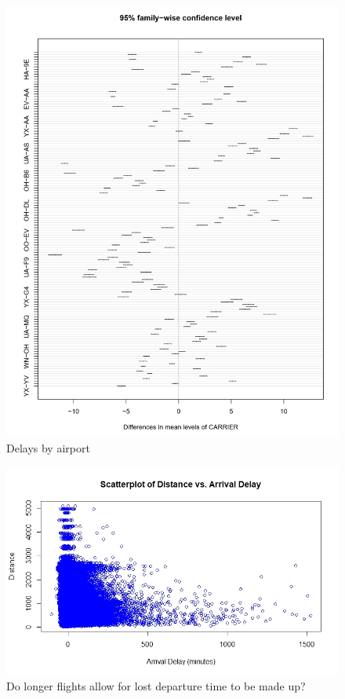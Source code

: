 \documentclass[12pt, a4paper, openany]{book}
\begin{document}
			\begin{figure}[h]
			\centering
	 		\includegraphics[width = 1 \textwidth]{../figures/PLOTS FOR REPORT/Chapter 4/Figure 4.7}
	 		\caption{Delays by airport}
	 		\end{figure}

			\begin{figure}[h]
			\centering
	 		\includegraphics[width = 1 \textwidth]{../figures/PLOTS FOR REPORT/Chapter 4/Figure 4.8}
	 		\caption{Do longer flights allow for lost departure time to be made up?}
	 		\end{figure}
\end{document}
